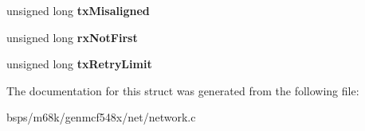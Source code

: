 \begin{DoxyCompactItemize}
\item 
\mbox{\label{structmcf548x__enet__struct_ab21cc62e68219e261986e07977ec62aa}} 
unsigned long {\bfseries tx\+Misaligned}
\item 
\mbox{\label{structmcf548x__enet__struct_ac66c44be32fc178cfbea3e087b089f86}} 
unsigned long {\bfseries rx\+Not\+First}
\item 
\mbox{\label{structmcf548x__enet__struct_ab8d83c023ed22529147d1c1c4ac563c0}} 
unsigned long {\bfseries tx\+Retry\+Limit}
\end{DoxyCompactItemize}


The documentation for this struct was generated from the following file\+:\begin{DoxyCompactItemize}
\item 
bsps/m68k/genmcf548x/net/network.\+c\end{DoxyCompactItemize}
